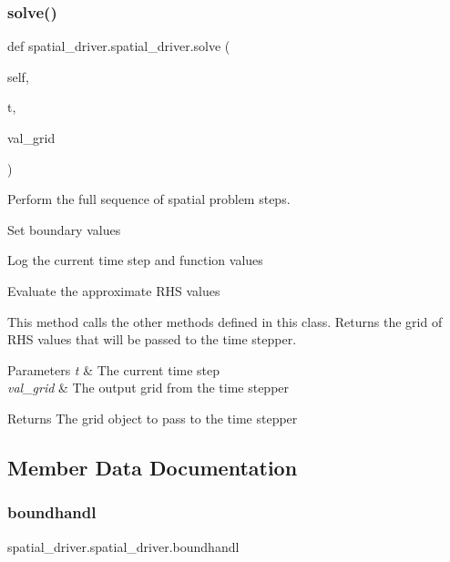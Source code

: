 \subsubsection{\texorpdfstring{solve()}{solve()}}
{\footnotesize\ttfamily def spatial\+\_\+driver.\+spatial\+\_\+driver.\+solve (\begin{DoxyParamCaption}\item[{}]{self,  }\item[{}]{t,  }\item[{}]{val\+\_\+grid }\end{DoxyParamCaption})}



Perform the full sequence of spatial problem steps. 


\begin{DoxyEnumerate}
\item Set boundary values
\item Log the current time step and function values
\item Evaluate the approximate R\+HS values
\end{DoxyEnumerate}

This method calls the other methods defined in this class. Returns the grid of R\+HS values that will be passed to the time stepper. 
\begin{DoxyParams}{Parameters}
{\em t} & The current time step \\
\hline
{\em val\+\_\+grid} & The output grid from the time stepper \\
\hline
\end{DoxyParams}
\begin{DoxyReturn}{Returns}
The grid object to pass to the time stepper 
\end{DoxyReturn}


\subsection{Member Data Documentation}
\mbox{\label{classspatial__driver_1_1spatial__driver_aeb66b87c7c18067c8a9a16b47bcbbd2f}} 
\subsubsection{\texorpdfstring{boundhandl}{boundhandl}}
{\footnotesize\ttfamily spatial\+\_\+driver.\+spatial\+\_\+driver.\+boundhandl}



